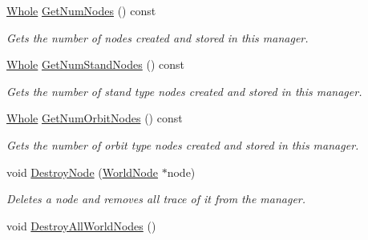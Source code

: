 \begin{DoxyCompactItemize}
\hyperlink{namespacephys_a460f6bc24c8dd347b05e0366ae34f34a}{Whole} \hyperlink{classphys_1_1SceneManager_a6ba57b9db1a1bfe2471425d6d8341272}{GetNumNodes} () const 
\begin{DoxyCompactList}\small\item\em Gets the number of nodes created and stored in this manager. \item\end{DoxyCompactList}\item 
\hyperlink{namespacephys_a460f6bc24c8dd347b05e0366ae34f34a}{Whole} \hyperlink{classphys_1_1SceneManager_ab80f76686a3cbf2c2ec49ae7eadf8c95}{GetNumStandNodes} () const 
\begin{DoxyCompactList}\small\item\em Gets the number of stand type nodes created and stored in this manager. \item\end{DoxyCompactList}\item 
\hyperlink{namespacephys_a460f6bc24c8dd347b05e0366ae34f34a}{Whole} \hyperlink{classphys_1_1SceneManager_ac54e082885d9df328aab3f8bcfaaaad2}{GetNumOrbitNodes} () const 
\begin{DoxyCompactList}\small\item\em Gets the number of orbit type nodes created and stored in this manager. \item\end{DoxyCompactList}\item 
void \hyperlink{classphys_1_1SceneManager_a5a2d68ab38308f9c6ac4b659cae36dee}{DestroyNode} (\hyperlink{classphys_1_1WorldNode}{WorldNode} $\ast$node)
\begin{DoxyCompactList}\small\item\em Deletes a node and removes all trace of it from the manager. \item\end{DoxyCompactList}\item 
\hypertarget{classphys_1_1SceneManager_a0a4f1d371b91848f1fac32aac153cc10}{
void \hyperlink{classphys_1_1SceneManager_a0a4f1d371b91848f1fac32aac153cc10}{DestroyAllWorldNodes} ()}
\label{classphys_1_1SceneManager_a0a4f1d371b91848f1fac32aac153cc10}


\end{DoxyCompactItemize}
